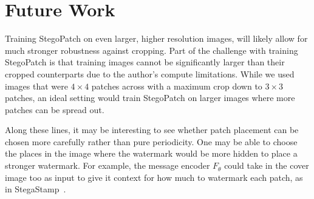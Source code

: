 \documentclass[twocolumn]{article}
\begin{document}
\section{Future Work}
Training StegoPatch on even larger, higher resolution images, will likely allow for much stronger robustness against cropping. Part of the challenge with training StegoPatch is that training images cannot be significantly larger than their cropped counterparts due to the author's compute limitations. While we used images that were $4\times 4$ patches across with a maximum crop down to $3\times 3$ patches, an ideal setting would train StegoPatch on larger images where more patches can be spread out.

Along these lines, it may be interesting to see whether patch placement can be chosen more carefully rather than pure periodicity. One may be able to choose the places in the image where the watermark would be more hidden to place a stronger watermark. For example, the message encoder $F_\theta$ could take in the cover image too as input to give it context for how much to watermark each patch, as in StegaStamp~\cite{tancik2020stegastamp}.
\end{document}
